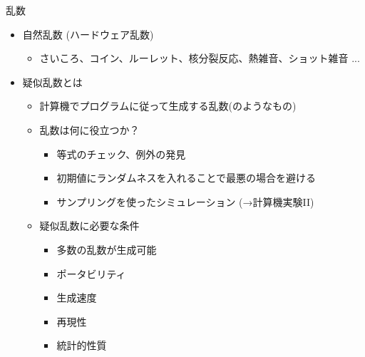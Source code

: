\begin{frame}[t,fragile]{乱数}
  \begin{itemize}
  \item 自然乱数 (ハードウェア乱数)
    \begin{itemize}
    \item さいころ、コイン、ルーレット、核分裂反応、熱雑音、ショット雑音 ...
    \end{itemize}
  \item 疑似乱数とは
    \begin{itemize}
    \item 計算機でプログラムに従って生成する乱数(のようなもの)
    \item 乱数は何に役立つか？
      \begin{itemize}
      \item 等式のチェック、例外の発見
      \item 初期値にランダムネスを入れることで最悪の場合を避ける
      \item サンプリングを使ったシミュレーション (→計算機実験II)
      \end{itemize}
    \item 疑似乱数に必要な条件
      \begin{itemize}
      \item 多数の乱数が生成可能
      \item ポータビリティ
      \item 生成速度
      \item 再現性
      \item 統計的性質
      \end{itemize}
    \end{itemize}
  \end{itemize}
\end{frame}
